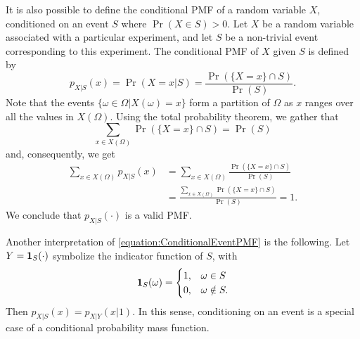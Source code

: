 It is also possible to define the conditional PMF of a random variable $X$, conditioned on an event $S$ where $\Pr (X \in S) > 0$.
Let $X$ be a random variable associated with a particular experiment, and let $S$ be a non-trivial event corresponding to this experiment.
The conditional PMF of $X$ given $S$ is defined by
\begin{equation} \label{equation:ConditionalEventPMF}
p_{X|S} (x) = \Pr (X = x | S)
= \frac{\Pr (\{X = x\} \cap S)}{\Pr (S)} .
\end{equation}
Note that the events $\{ \omega \in \Omega |  X(\omega) = x \}$ form a partition of $\Omega$ as $x$ ranges over all the values in $X (\Omega)$.
Using the total probability theorem, we gather that
\begin{equation*}
\sum_{x \in X(\Omega)} \Pr ( \{X = x\} \cap S) = \Pr (S)
\end{equation*}
and, consequently, we get
\begin{equation*}
\begin{split}
\sum_{x \in X(\Omega)} p_{X|S} (x)
&= \sum_{x \in X(\Omega)} \frac{\Pr (\{X = x\} \cap S)}{\Pr (S)} \\
&= \frac{\sum_{x \in X(\Omega)} \Pr (\{X = x\} \cap S)}{\Pr (S)}
=1 .
\end{split}
\end{equation*}
We conclude that $p_{X|S} (\cdot)$ is a valid PMF.

Another interpretation of \eqref{equation:ConditionalEventPMF} is the following.
Let $Y = \mathbf{1}_S (\cdot)$ symbolize the indicator function of $S$, with
\begin{equation*}
\mathbf{1}_S (\omega) = \begin{cases} 1, & \omega \in S\\
0, & \omega \notin S . \end{cases}
\end{equation*}
Then $p_{X|S} (x) = p_{X|Y} (x | 1)$.
In this sense, conditioning on an event is a special case of a conditional probability mass function.

